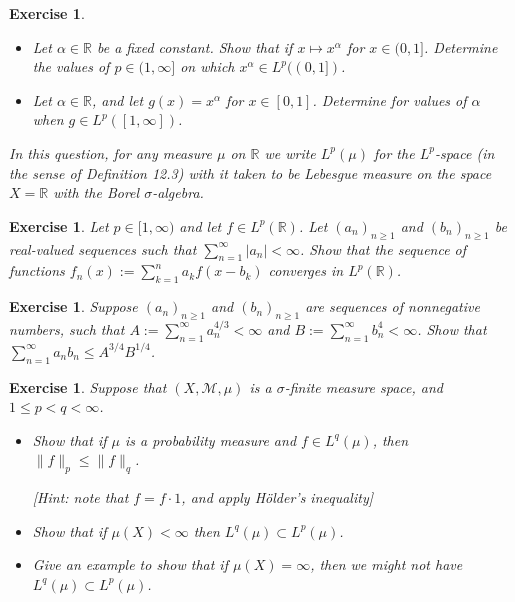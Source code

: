 \documentclass{article}
\newtheorem{exercise}[theorem]{Exercise}
\begin{document}
\begin{exercise}
\begin{itemize}
    \item[(a)] Let $\alpha \in \mathbb{R}$ be a fixed constant. Show that if $x \mapsto x^{\alpha}$ for $x \in (0,1]$. Determine the values of $p \in (1,\infty]$ on which $x^{\alpha} \in L^p((0,1])$.
    \item[(b)] Let $\alpha \in \mathbb{R}$, and let $g(x) = x^{\alpha}$ for $x \in [0,1]$. Determine for values of $\alpha$ when $g \in L^p([1,\infty])$.
\end{itemize}

\textit{In this question, for any measure $\mu$ on $\mathbb{R}$ we write $L^p(\mu)$ for the $L^p$-space (in the sense of Definition 12.3) with it taken to be Lebesgue measure on the space $X = \mathbb{R}$ with the Borel $\sigma$-algebra.}
\end{exercise}

\begin{exercise}
Let $p \in [1, \infty)$ and let $f \in L^p(\mathbb{R})$. Let $(a_n)_{n \geq 1}$ and $(b_n)_{n \geq 1}$ be real-valued sequences such that $\sum_{n=1}^{\infty} |a_n| < \infty$. Show that the sequence of functions $f_n(x) := \sum_{k=1}^{n} a_k f(x - b_k)$ converges in $L^p(\mathbb{R})$.
\end{exercise}

\begin{exercise}
Suppose $(a_n)_{n \geq 1}$ and $(b_n)_{n \geq 1}$ are sequences of nonnegative numbers, such that $A := \sum_{n=1}^{\infty} a_n^{4/3} < \infty$ and $B := \sum_{n=1}^{\infty} b_n^4 < \infty$. Show that $\sum_{n=1}^{\infty} a_n b_n \leq A^{3/4} B^{1/4}$.
\end{exercise}

\begin{exercise}
Suppose that $(X, \mathcal{M}, \mu)$ is a $\sigma$-finite measure space, and $1 \leq p < q < \infty$.
\begin{itemize}
    \item[(a)] Show that if $\mu$ is a probability measure and $f \in L^q(\mu)$, then $\|f\|_p \leq \|f\|_q$.

    \textit{[Hint: note that $f = f \cdot 1$, and apply Hölder’s inequality]}
    
    \item[(b)] Show that if $\mu(X) < \infty$ then $L^q(\mu) \subset L^p(\mu)$.
    
    \item[(c)] Give an example to show that if $\mu(X) = \infty$, then we might not have $L^q(\mu) \subset L^p(\mu)$.
\end{itemize}
\end{exercise}
\end{document}
